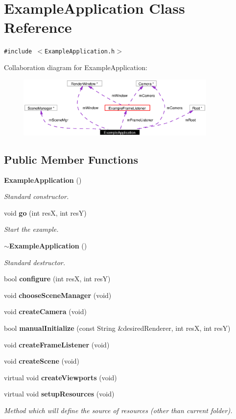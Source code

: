 \section{Example\-Application Class Reference}
\label{classExampleApplication}
{\tt \#include $<$Example\-Application.h$>$}

Collaboration diagram for Example\-Application:\begin{figure}[H]
\begin{center}
\leavevmode
\includegraphics[width=280pt]{classExampleApplication__coll__graph}
\end{center}
\end{figure}
\subsection*{Public Member Functions}
\begin{CompactItemize}
\item 
{\bf Example\-Application} ()
\begin{CompactList}\small\item\em Standard constructor. \item\end{CompactList}\item 
void {\bf go} (int res\-X, int res\-Y)
\begin{CompactList}\small\item\em Start the example. \item\end{CompactList}\item 
{\bf $\sim$Example\-Application} ()
\begin{CompactList}\small\item\em Standard destructor. \item\end{CompactList}\item 
bool {\bf configure} (int res\-X, int res\-Y)
\item 
void {\bf choose\-Scene\-Manager} (void)
\item 
void {\bf create\-Camera} (void)
\item 
bool {\bf manual\-Initialize} (const String \&desired\-Renderer, int res\-X, int res\-Y)
\item 
void {\bf create\-Frame\-Listener} (void)
\item 
void {\bf create\-Scene} (void)
\item 
virtual void {\bf create\-Viewports} (void)
\item 
virtual void {\bf setup\-Resources} (void)
\begin{CompactList}\small\item\em Method which will define the source of resources (other than current folder). \item\end{CompactList}\end{CompactItemize}

